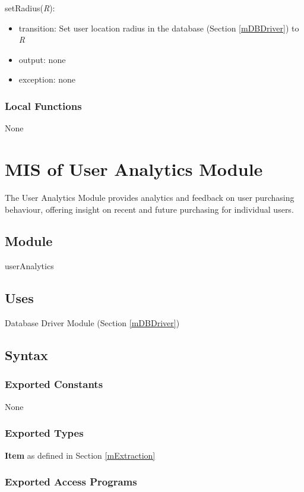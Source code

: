\documentclass[12pt, titlepage]{article}
\begin{document}
\noindent setRadius(\textit{R}):
\begin{itemize}
\item transition: Set user location radius in the database (Section \ref{mDBDriver}) to \textit{R}
\item output: none
\item exception: none
\end{itemize}


\subsubsection{Local Functions}
None

\newpage

\section{MIS of User Analytics Module} \label{mAnalytics} 
The User Analytics Module provides analytics and feedback on user purchasing behaviour, offering insight on recent and future purchasing for individual users.

\subsection{Module}

userAnalytics

\subsection{Uses}

Database Driver Module (Section \ref{mDBDriver})

\subsection{Syntax}

\subsubsection{Exported Constants}
None

\subsubsection{Exported Types}

\textbf{Item} as defined in Section \ref{mExtraction}

\subsubsection{Exported Access Programs}
\end{document}
